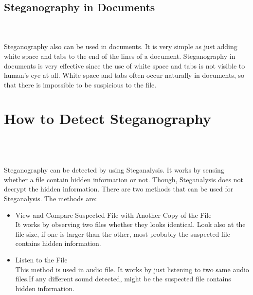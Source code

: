 \documentclass[conference, compsoc]{IEEEtran}
\begin{document}
\subsection{Steganography in Documents}
\\
\\
Steganography also can be used in documents. It is very simple as just adding white space and tabs to the end of the lines of a document. Steganography in documents is very effective since the use of white space and tabs is not visible to human's eye at all. White space and tabs often occur naturally in documents, so that there is impossible to be suspicious to the file.

\section{How to Detect Steganography}\\
\\
\\
Steganography can be detected by using Steganalysis. It works by sensing whether a file contain hidden information or not. Though, Steganalysis does not decrypt the hidden information. There are two methods that can be used for Steganalysis. The methods are:
\\
\begin{itemize}
\item View and Compare Suspected File with Another Copy of the   		  File\\
      It works by observing two files whether they looks  				  identical. Look also at the file size, if one is larger 			  than the other, most probably the suspected file contains 		  hidden information.\\
\item Listen to the File\\
      This method is used in audio file. It works by just   			  listening to two same audio files.If any different sound  		  detected, might be the suspected file contains hidden 			  information.              
\end{itemize}
\\
\end{document}
